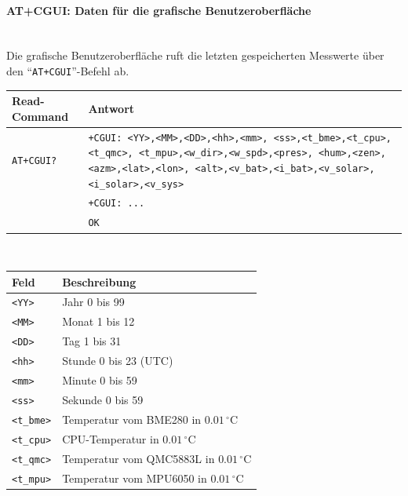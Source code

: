         \paragraph{AT+CGUI: Daten für die grafische Benutzeroberfläche}\mbox{}\\
        Die grafische Benutzeroberfläche ruft die letzten gespeicherten Messwerte über den ``\texttt{AT+CGUI}''-Befehl ab.
        \begin{table}[H]
            \centering
            \begin{tabular}{|p{}|p{}|}
                \hline
                \textbf{Read-Command} &\textbf{Antwort} \\
                \hline
                \texttt{AT+CGUI?}  & \texttt{+CGUI: <YY>,<MM>,<DD>,<hh>,<mm>, <ss>,<t\_bme>,<t\_cpu>,<t\_qmc>, <t\_mpu>,<w\_dir>,<w\_spd>,<pres>, <hum>,<zen>,<azm>,<lat>,<lon>, <alt>,<v\_bat>,<i\_bat>,<v\_solar>, <i\_solar>,<v\_sys>}\\
                & \texttt{+CGUI: ...}\\
                & \texttt{OK}\\
                \hline
            \end{tabular}\\[3mm]
            \begin{tabular}{|p{}|p{}|}
                \hline
                \textbf{Feld}       & \textbf{Beschreibung}\\
                \hline
                \texttt{<YY>}       & Jahr 0 bis 99 \\
                \texttt{<MM>}       & Monat 1 bis 12 \\
                \texttt{<DD>}       & Tag 1 bis 31 \\
                \texttt{<hh>}       & Stunde 0 bis 23 (UTC) \\
                \texttt{<mm>}       & Minute 0 bis 59 \\
                \texttt{<ss>}       & Sekunde 0 bis 59 \\
                \texttt{<t\_bme>}   & Temperatur vom BME280 in $0.01\,^\circ\mathrm{C}$\\
                \texttt{<t\_cpu>}   & CPU-Temperatur in $0.01\,^\circ\mathrm{C}$\\
                \texttt{<t\_qmc>}   & Temperatur vom QMC5883L in $0.01\,^\circ\mathrm{C}$\\
                \texttt{<t\_mpu>}   & Temperatur vom MPU6050 in $0.01\,^\circ\mathrm{C}$\\

\end{tabular}
\end{table}
